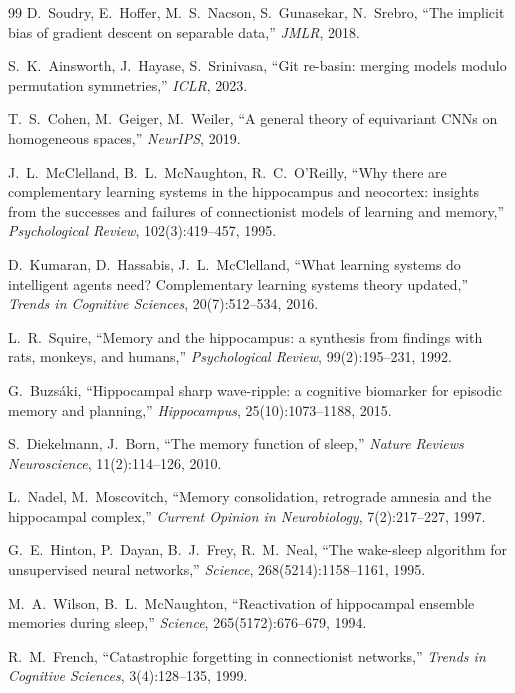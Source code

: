 \documentclass[11pt, a4paper]{article}
\theoremstyle{plain}
\theoremstyle{definition}
\theoremstyle{remark}
\begin{document}
\begin{thebibliography}{99}
D.~Soudry, E.~Hoffer, M.~S.~Nacson, S.~Gunasekar, N.~Srebro, ``The implicit bias of gradient descent on separable data,'' \emph{JMLR}, 2018.

S.~K.~Ainsworth, J.~Hayase, S.~Srinivasa, ``Git re-basin: merging models modulo permutation symmetries,'' \emph{ICLR}, 2023.

T.~S.~Cohen, M.~Geiger, M.~Weiler, ``A general theory of equivariant CNNs on homogeneous spaces,'' \emph{NeurIPS}, 2019.


J.~L.~McClelland, B.~L.~McNaughton, R.~C.~O'Reilly, ``Why there are complementary learning systems in the hippocampus and neocortex: insights from the successes and failures of connectionist models of learning and memory,'' \emph{Psychological Review}, 102(3):419--457, 1995.

D.~Kumaran, D.~Hassabis, J.~L.~McClelland, ``What learning systems do intelligent agents need? Complementary learning systems theory updated,'' \emph{Trends in Cognitive Sciences}, 20(7):512--534, 2016.

L.~R.~Squire, ``Memory and the hippocampus: a synthesis from findings with rats, monkeys, and humans,'' \emph{Psychological Review}, 99(2):195--231, 1992.

G.~Buzs\'{a}ki, ``Hippocampal sharp wave-ripple: a cognitive biomarker for episodic memory and planning,'' \emph{Hippocampus}, 25(10):1073--1188, 2015.

S.~Diekelmann, J.~Born, ``The memory function of sleep,'' \emph{Nature Reviews Neuroscience}, 11(2):114--126, 2010.

L.~Nadel, M.~Moscovitch, ``Memory consolidation, retrograde amnesia and the hippocampal complex,'' \emph{Current Opinion in Neurobiology}, 7(2):217--227, 1997.

G.~E.~Hinton, P.~Dayan, B.~J.~Frey, R.~M.~Neal, ``The wake-sleep algorithm for unsupervised neural networks,'' \emph{Science}, 268(5214):1158--1161, 1995.

M.~A.~Wilson, B.~L.~McNaughton, ``Reactivation of hippocampal ensemble memories during sleep,'' \emph{Science}, 265(5172):676--679, 1994.

R.~M.~French, ``Catastrophic forgetting in connectionist networks,'' \emph{Trends in Cognitive Sciences}, 3(4):128--135, 1999.

\end{thebibliography}
\end{document}
